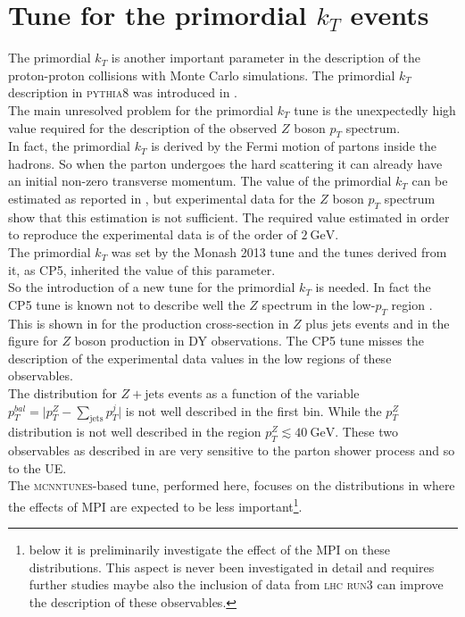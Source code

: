 \chapter{Tune for the primordial $k_T$ events}
\label{chap:primordialkTtune}

The primordial $k_T$ is another important parameter in the description of the proton-proton collisions with Monte Carlo simulations. The primordial $k_T$ description in \textsc{pythia8} was introduced in .
\\
The main unresolved problem for the primordial $k_T$ tune is the unexpectedly high value required for the description of the observed $Z$ boson $p_T$ spectrum.
\\
In fact, the primordial $k_T$ is derived by the Fermi motion of partons inside the hadrons. So when the parton undergoes the hard scattering it can already have an initial non-zero transverse momentum.
The value of the primordial $k_T$ can be estimated as reported in , but experimental data for the $Z$ boson $p_T$ spectrum show that this estimation is not sufficient. The required value estimated in order to  reproduce the experimental data is of the order of $2\ \mathrm{GeV}$.
\\
%
The primordial $k_T$ was set by the Monash 2013 tune \cite{Monash} and the tunes derived from it, as CP5, inherited the value of this parameter.
\\
So the introduction of a new tune for the primordial $k_T$ is needed. In fact the CP5 tune is known not to describe well the $Z$ spectrum in the low-$p_T$ region \cite{CPtunes}. This is shown in  for the production cross-section in $Z$ plus jets events and in the figure  for $Z$ boson production in DY observations. The CP5 tune misses the description of the experimental data values in the low regions of these observables. 
\\
The distribution for $Z+$jets events as a function of the variable $p_T^{bal}=\big|p_T^Z-\sum_{\text{jets}}p_T^{j}\big|$ is not well described in the first bin. While the $p_T^Z$ distribution is not well described in the region $p_T^Z \lesssim 40\ \mathrm{GeV}$. These two observables as described in \cite{CPtunes} are very sensitive to the parton shower process and so to the UE.
\\
The \textsc{mcnntunes}-based tune, performed here, focuses on the distributions in  where the effects of MPI are expected to be less important\footnote{below it is preliminarily investigate the effect of the MPI on these distributions. This aspect is never been investigated in detail and requires further studies maybe also the inclusion of data from \textsc{lhc} \textsc{run3} can improve the description of these observables.}.  


